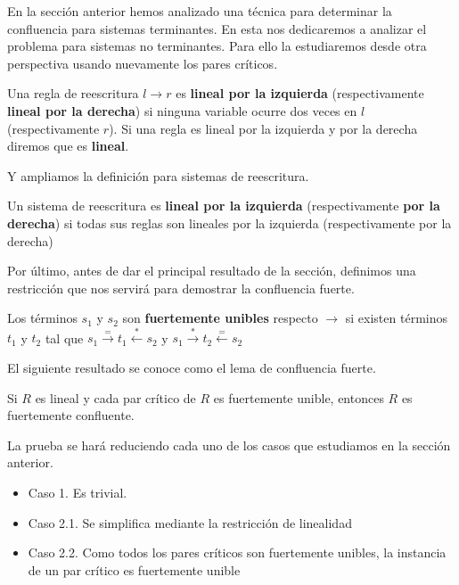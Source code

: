 En la sección anterior hemos analizado una técnica para determinar la
confluencia para sistemas terminantes. En esta nos dedicaremos a
analizar el problema para sistemas no terminantes. Para ello la
estudiaremos desde otra perspectiva usando nuevamente los pares
críticos.

\begin{defi}
  Una regla de reescritura $l \rightarrow r$ es \textbf{lineal por la
  izquierda} (respectivamente \textbf{lineal por la derecha}) si ninguna
  variable ocurre dos veces en $l$ (respectivamente $r$). Si una regla
  es lineal por la izquierda y por la derecha diremos que es \textbf{lineal}. 
\end{defi}

Y ampliamos la definición para sistemas de reescritura.

\begin{defi}
  Un sistema de reescritura es \textbf{lineal por la izquierda}
  (respectivamente \textbf{por la derecha}) si todas sus reglas son lineales por
  la izquierda (respectivamente por la derecha)
\end{defi}

Por último, antes de dar el principal resultado de la sección,
definimos una restricción que nos servirá para demostrar la
confluencia fuerte.

\begin{defi}
  Los términos $s_1$ y $s_2$ son \textbf{fuertemente unibles} respecto
  $\rightarrow$ si existen términos $t_1$ y $t_2$ tal que
  $s_1 \xrightarrow{=} t_1 \xleftarrow{*} s_2$ y $s_1 \xrightarrow{*}
  t_2 \xleftarrow{=} s_2$
\end{defi}


El siguiente resultado se conoce como el lema de confluencia fuerte.

\begin{lema}
  Si $R$ es lineal y cada par crítico de $R$ es fuertemente unible,
  entonces $R$ es fuertemente confluente.
\end{lema}

\begin{demo}
  La prueba se hará reduciendo cada uno de los casos que estudiamos en
  la sección anterior.
  
  \begin{itemize}
    
  \item Caso 1. Es trivial.

  \item Caso 2.1. Se simplifica mediante la restricción de linealidad

  \item Caso 2.2. Como todos los pares críticos son fuertemente
    unibles, la instancia de un par crítico es fuertemente unible

  \end{itemize}

\end{demo}

